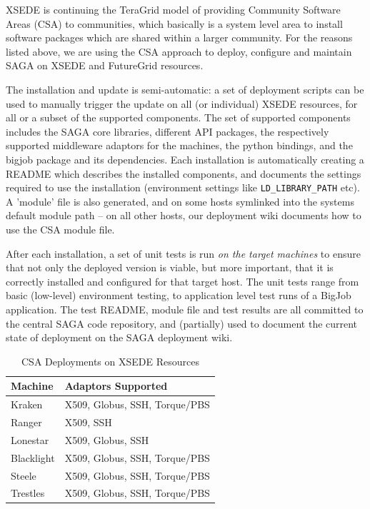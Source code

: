 \documentclass{sig-alternate}
\begin{document}
 XSEDE is continuing the TeraGrid model of providing Community
 Software Areas (CSA) to communities, which basically is a system
 level area to install software packages which are shared within a
 larger community.  For the reasons listed above, we are using the CSA
 approach to deploy, configure and maintain SAGA on XSEDE and
 FutureGrid resources.

 The installation and update is semi-automatic: a set of deployment
 scripts can be used to manually trigger the update on all (or
 individual) XSEDE resources, for all or a subset of the supported
 components.  The set of supported components includes the SAGA core
 libraries, different API packages, the respectively supported
 middleware adaptors for the machines, the python bindings, and the
 bigjob package and its dependencies.  Each installation is
 automatically creating a README which describes the installed
 components, and documents the settings required to use the
 installation (environment settings like \texttt{LD\_LIBRARY\_PATH} etc).  A
 'module' file is also generated, and on some hosts symlinked into the
 systems default module path -- on all other hosts, our deployment
 wiki documents how to use the CSA module file.

 After each installation, a set of unit tests is run \textit{on the
 target machines} to ensure that not only the deployed version is
 viable, but more important, that it is correctly installed and
 configured for that target host.  The unit tests range from basic
 (low-level) environment testing, to application level test runs of a
 BigJob application.  The test README, module file and test results
 are all committed to the central SAGA code repository, and
 (partially) used to document the current state of deployment on the
 SAGA deployment wiki.

\begin{table}
\begin{center}
\begin{tabular}{ll}
\toprule
\textbf{Machine}  & 
\textbf{Adaptors Supported} 
\\ \midrule
Kraken   & 
X509, Globus, SSH, Torque/PBS
\\ \midrule
Ranger   & 
X509, SSH
\\ \midrule
Lonestar & 
X509, Globus, SSH
\\ \midrule
Blacklight & 
X509, Globus, SSH, Torque/PBS
\\ \midrule
Steele & 
X509, Globus, SSH, Torque/PBS
\\ \midrule
Trestles & 
X509, Globus, SSH, Torque/PBS
\\ \bottomrule
\end{tabular}
\caption{CSA Deployments on XSEDE Resources}
\label{table:CSA-Deployments}
\end{center}
\end{table}
\end{document}
